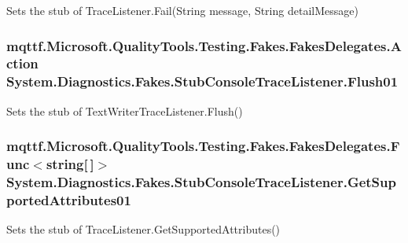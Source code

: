 Sets the stub of Trace\-Listener.\-Fail(\-String message, String detail\-Message)

\hypertarget{class_system_1_1_diagnostics_1_1_fakes_1_1_stub_console_trace_listener_a42d9c17dec0c1481190261610f1b807a}{
\subsubsection[{Flush01}]{\setlength{\rightskip}{0pt plus 5cm}mqttf.\-Microsoft.\-Quality\-Tools.\-Testing.\-Fakes.\-Fakes\-Delegates.\-Action System.\-Diagnostics.\-Fakes.\-Stub\-Console\-Trace\-Listener.\-Flush01}}\label{class_system_1_1_diagnostics_1_1_fakes_1_1_stub_console_trace_listener_a42d9c17dec0c1481190261610f1b807a}


Sets the stub of Text\-Writer\-Trace\-Listener.\-Flush()

\hypertarget{class_system_1_1_diagnostics_1_1_fakes_1_1_stub_console_trace_listener_a5f46e56335785ab10791fc54d943d7ed}{
\subsubsection[{Get\-Supported\-Attributes01}]{\setlength{\rightskip}{0pt plus 5cm}mqttf.\-Microsoft.\-Quality\-Tools.\-Testing.\-Fakes.\-Fakes\-Delegates.\-Func$<$string\mbox{[}$\,$\mbox{]}$>$ System.\-Diagnostics.\-Fakes.\-Stub\-Console\-Trace\-Listener.\-Get\-Supported\-Attributes01}}\label{class_system_1_1_diagnostics_1_1_fakes_1_1_stub_console_trace_listener_a5f46e56335785ab10791fc54d943d7ed}


Sets the stub of Trace\-Listener.\-Get\-Supported\-Attributes()

